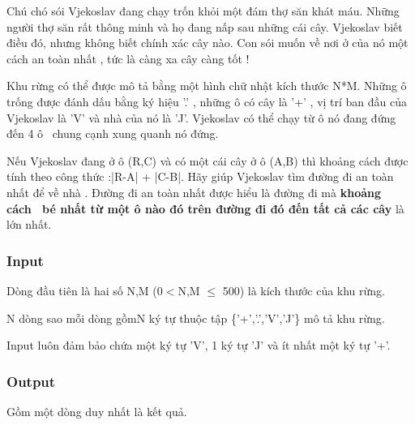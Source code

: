 



   Chú chó sói Vjekoslav đang chạy trốn khỏi một đám thợ săn khát máu. Những người thợ săn rất thông minh và họ đang nấp sau những cái cây. Vjekoslav biết điều đó, nhưng không biết chính xác cây nào. Con sói muốn về nơi ở của nó một cách an toàn nhất , tức là càng xa cây càng tốt !  

   Khu rừng có thể được mô tả bằng một hình chữ nhật kích thước N*M. Những ô trống được đánh dấu bằng ký hiệu '.' , những ô có cây là '+' , vị trí ban đầu của Vjekoslav là 'V' và nhà của nó là 'J'. Vjekoslav có thể chạy từ ô nó đang đứng đến 4 ô  chung cạnh xung quanh nó đứng.  

   Nếu Vjekoslav đang ở ô (R,C) và có một cái cây ở ô (A,B) thì khoảng cách được tính theo công thức :|R-A| + |C-B|. Hãy giúp Vjekoslav tìm đường đi an toàn nhất để về nhà . Đường đi an toàn nhất được hiểu là đường đi mà   \textbf{    khoảng cách  bé nhất từ một ô nào đó trên đường đi đó đến tất cả các cây   }   là lớn nhất.  

\subsubsection{   Input  }

   Dòng đầu tiên là hai số N,M (0$<$N,M  $\le$ 500) là kích thước của khu rừng.  

   N dòng sao mỗi dòng gồmN ký tự thuộc tập \{'+','.','V','J'\} mô tả khu rừng.  

   Input luôn đảm bảo chứa một ký tự 'V', 1 ký tự 'J' và ít nhất một ký tự '+'.  

\subsubsection{   Output  }

   Gồm một dòng duy nhất là kết quả.  

